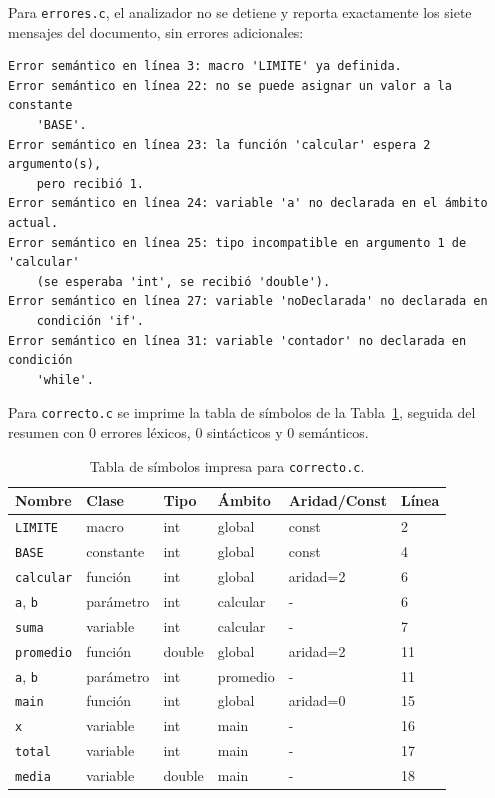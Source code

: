 \documentclass[runningheads]{llncs}
\begin{document}
Para \texttt{errores.c}, el analizador no se detiene y reporta exactamente los siete mensajes del documento, sin errores adicionales:

\begin{lstlisting}
Error semántico en línea 3: macro 'LIMITE' ya definida.
Error semántico en línea 22: no se puede asignar un valor a la constante
    'BASE'.
Error semántico en línea 23: la función 'calcular' espera 2 argumento(s),
    pero recibió 1.
Error semántico en línea 24: variable 'a' no declarada en el ámbito actual.
Error semántico en línea 25: tipo incompatible en argumento 1 de 'calcular'
    (se esperaba 'int', se recibió 'double').
Error semántico en línea 27: variable 'noDeclarada' no declarada en
    condición 'if'.
Error semántico en línea 31: variable 'contador' no declarada en condición
    'while'.
\end{lstlisting}

Para \texttt{correcto.c} se imprime la tabla de símbolos de la Tabla~\ref{tab:ts}, seguida del resumen con 0 errores léxicos, 0 sintácticos y 0 semánticos.

\begin{table}[t]
\caption{Tabla de símbolos impresa para \texttt{correcto.c}.}\label{tab:ts}
\centering\footnotesize
\begin{tabular}{@{}llllll@{}}
\toprule
Nombre & Clase & Tipo & Ámbito & Aridad/Const & Línea\\
\midrule
\texttt{LIMITE} & macro & int & global & const & 2\\
\texttt{BASE} & constante & int & global & const & 4\\
\texttt{calcular} & función & int & global & aridad=2 & 6\\
\texttt{a}, \texttt{b} & parámetro & int & calcular & - & 6\\
\texttt{suma} & variable & int & calcular & - & 7\\
\texttt{promedio} & función & double & global & aridad=2 & 11\\
\texttt{a}, \texttt{b} & parámetro & int & promedio & - & 11\\
\texttt{main} & función & int & global & aridad=0 & 15\\
\texttt{x} & variable & int & main & - & 16\\
\texttt{total} & variable & int & main & - & 17\\
\texttt{media} & variable & double & main & - & 18\\
\bottomrule
\end{tabular}
\end{table}
\end{document}
